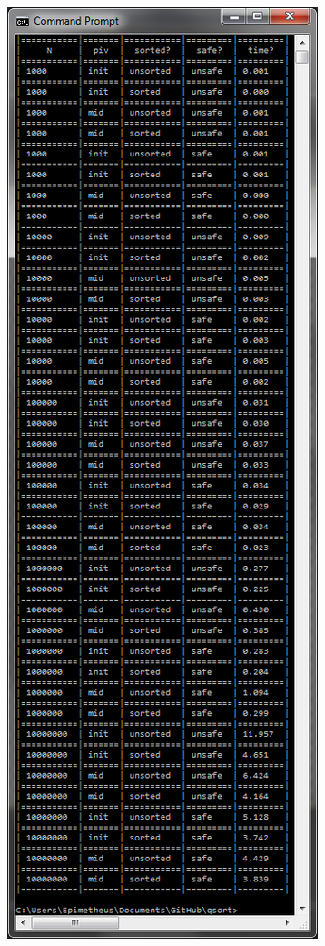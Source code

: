 \documentclass[paper=a4,fontsize=11pt]{article}
\begin{document}
\includegraphics[scale = 2]{table.png}
\newpage
\end{document}

